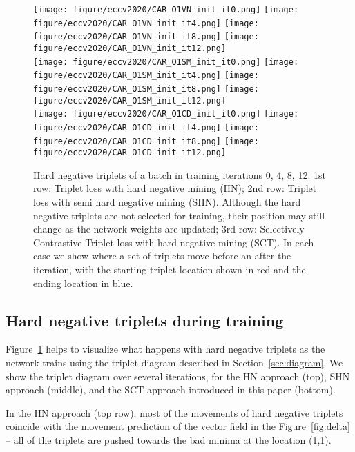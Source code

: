 \documentclass[runningheads]{llncs}
\begin{document}
\begin{figure}
  \centering
  \texttt{[image: figure/eccv2020/CAR\_O1VN\_init\_it0.png]}
  \texttt{[image: figure/eccv2020/CAR\_O1VN\_init\_it4.png]}
  \texttt{[image: figure/eccv2020/CAR\_O1VN\_init\_it8.png]}
  \texttt{[image: figure/eccv2020/CAR\_O1VN\_init\_it12.png]}\\
  \texttt{[image: figure/eccv2020/CAR\_O1SM\_init\_it0.png]}
  \texttt{[image: figure/eccv2020/CAR\_O1SM\_init\_it4.png]}
  \texttt{[image: figure/eccv2020/CAR\_O1SM\_init\_it8.png]}
  \texttt{[image: figure/eccv2020/CAR\_O1SM\_init\_it12.png]}\\
  \texttt{[image: figure/eccv2020/CAR\_O1CD\_init\_it0.png]}
  \texttt{[image: figure/eccv2020/CAR\_O1CD\_init\_it4.png]}
  \texttt{[image: figure/eccv2020/CAR\_O1CD\_init\_it8.png]}
  \texttt{[image: figure/eccv2020/CAR\_O1CD\_init\_it12.png]}
  \caption{Hard negative triplets of a batch in training iterations 0, 4, 8, 12. 1st row: Triplet loss with hard negative mining (HN); 2nd row: Triplet loss with semi hard negative mining (SHN). Although the hard negative triplets are not selected for training, their position may still change as the network weights are updated; 3rd row: Selectively Contrastive Triplet loss with hard negative mining (SCT).  In each case we show where a set of triplets move before an after the iteration, with the starting triplet location shown in red and the ending location in blue.}
  \label{fig:init}
\end{figure}

\subsection{Hard negative triplets during training}
Figure~\ref{fig:init} helps to visualize what happens with hard negative triplets as the network trains using the triplet diagram described in Section~\ref{sec:diagram}. We show the triplet diagram over several iterations, for the HN approach (top), SHN approach (middle), and the SCT approach introduced in this paper (bottom). 

In the HN approach (top row), most of the movements of hard negative triplets coincide with the movement prediction of the vector field in the Figure~\ref{fig:delta} -- all of the triplets are pushed towards the bad minima at the location (1,1). 
\end{document}
